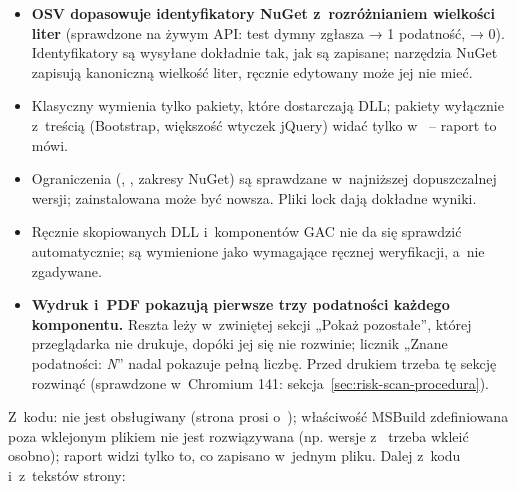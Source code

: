 \begin{itemize}
  \item \textbf{OSV dopasowuje identyfikatory NuGet z~rozróżnianiem wielkości liter}
        (sprawdzone na żywym API: test dymny zgłasza  → 1
        podatność,  → 0). Identyfikatory są wysyłane dokładnie tak,
        jak są zapisane; narzędzia NuGet zapisują kanoniczną wielkość liter, ręcznie
        edytowany  może jej nie mieć.
  \item Klasyczny  wymienia tylko pakiety, które dostarczają DLL; pakiety
        wyłącznie z~treścią (Bootstrap, większość wtyczek jQuery) widać tylko
        w~ -- raport to mówi.
  \item Ograniczenia (, , zakresy NuGet) są
        sprawdzane w~najniższej dopuszczalnej wersji; zainstalowana może być nowsza. Pliki lock
        dają dokładne wyniki.
  \item Ręcznie skopiowanych DLL i~komponentów GAC nie da się sprawdzić automatycznie; są
        wymienione jako wymagające ręcznej weryfikacji, a~nie zgadywane.
  \item \textbf{Wydruk i~PDF pokazują pierwsze trzy podatności każdego komponentu.} Reszta
        leży w~zwiniętej sekcji „Pokaż pozostałe”, której przeglądarka nie drukuje, dopóki jej
        się nie rozwinie; licznik „Znane podatności: \emph{N}” nadal pokazuje pełną liczbę.
        Przed drukiem trzeba tę sekcję rozwinąć (sprawdzone w~Chromium 141:
        sekcja~\ref{sec:risk-scan-procedura}).
\end{itemize}

Z~kodu:  nie jest obsługiwany (strona prosi o~);
właściwość MSBuild zdefiniowana poza wklejonym plikiem nie jest rozwiązywana (np. wersje
z~ trzeba wkleić osobno); raport widzi tylko to, co zapisano
w~jednym pliku. Dalej z~kodu i~z~tekstów strony:

